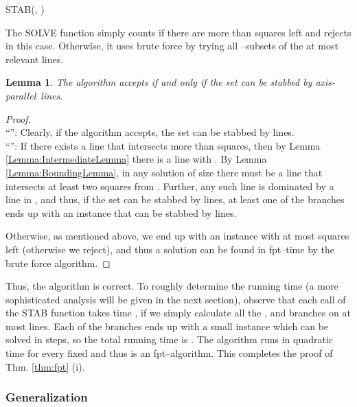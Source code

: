 \documentclass[12pt]{article}
\newtheorem{lemma}[definition]{Lemma}
\newcommand{\ap}{a.p.\ }
\renewcommand{\ap}{axis-parallel\ }
\begin{document}
\begin{algorithm}
\caption{STAB(, )}
\label{alg:fpt1}
\begin{algorithmic}
\IF {}	
\ELSIF {} \RETURN 
\ENDIF
{}
  \ENDFOR
\ELSE
\ENDIF 
\end{algorithmic}
\end{algorithm}  



The SOLVE function simply counts if there are more than  squares left and rejects in this case. Otherwise, it uses brute force by trying all --subsets of the at most  relevant lines.
\begin{lemma} The algorithm accepts if and only if the set can be stabbed by  \ap lines.
\end{lemma}
\begin{proof}\ \\
``'': Clearly, if the algorithm accepts, the set can be stabbed by  lines.\\
``'': If there exists a line  that intersects more than  squares, then by Lemma \ref{Lemma:IntermediateLemma} there is a line  with . By Lemma \ref{Lemma:BoundingLemma}, in any solution of size  there must be a line that intersects at least two squares from . Further, any such line is dominated by a line in , and thus, if the set can be stabbed by  lines, at least one of the branches ends up with an instance that can be stabbed by  lines.

Otherwise, as mentioned above, we end up with an instance with at most  squares left (otherwise we reject), and thus a solution can be found in fpt--time by the brute force algorithm.

\end{proof}
Thus, the algorithm is correct. To roughly determine the running time (a more sophisticated analysis will be given in the next section), observe that each call of the STAB function takes time , if we simply calculate all the , and branches on at most  lines. Each of the branches ends up with a small instance which can be solved in  steps, so the total running time is . The algorithm runs in quadratic time for every fixed  and thus is an fpt--algorithm. This completes the proof of Thm. \ref{thm:fpt} (i).



 
\subsubsection{Generalization}\label{sssec:FPTGeneralized}
\end{document}
